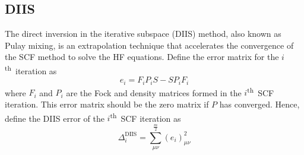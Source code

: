 \documentclass[final,3p,times,twocolumn]{elsarticle}
\newcommand{\ssth}{\textsuperscript{th}}
\begin{document}
\subsection{DIIS} \label{sec:diis}
The direct inversion in the iterative subspace (DIIS) method, also known as Pulay mixing, is an extrapolation technique that accelerates the convergence of the SCF method to solve the HF equations.\cite{diis} Define the error matrix for the $i$\ssth\ iteration as
\begin{equation} \label{eq:diiserror}
e_i = F_iP_iS - SP_iF_i
\end{equation}
where $F_i$ and $P_i$ are the Fock and density matrices formed in the $i$\ssth\ SCF iteration. This error matrix should be the zero matrix if $P$ has converged. 
Hence, define the DIIS error of the $i$\ssth\ SCF iteration as
\begin{equation} \label{eq:diiserrorterm}
\Delta_i^{\text{DIIS}} = \sum_{\mu\nu}^\frac{m}{2} (e_i)_{\mu\nu}^2
\end{equation}
\end{document}
